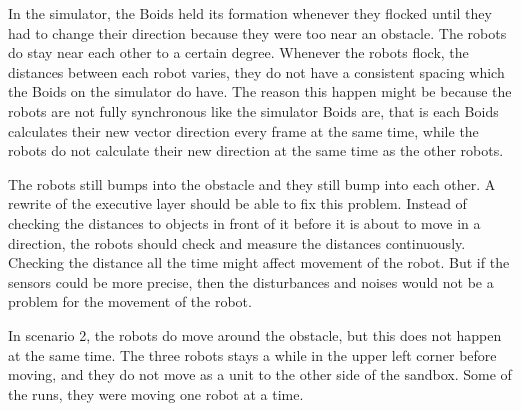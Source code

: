 In the simulator, the Boids held its formation whenever they flocked until they had to change their direction because they were too near an obstacle. The robots do stay near each other to a certain degree. Whenever the robots flock, the distances between each robot varies, they do not have a consistent spacing which the Boids on the simulator do have. The reason this happen might be because the robots are not fully synchronous like the simulator Boids are, that is each Boids calculates their new vector direction every frame at the same time, while the robots do not calculate their new direction at the same time as the other robots. 

The robots still bumps into the obstacle and they still bump into each other. A rewrite of the executive layer should be able to fix this problem. Instead of checking the distances to objects in front of it before it is about to move in a direction, the robots should check and measure the distances continuously. Checking the distance all the time might affect movement of the robot. But if the sensors could be more precise, then the disturbances and noises would not be a problem for the movement of the robot.

In scenario 2, the robots do move around the obstacle, but this does not happen at the same time. The three robots stays a while in the upper left corner before moving, and they do not move as a unit to the other side of the sandbox. Some of the runs, they were moving one robot at a time. 





